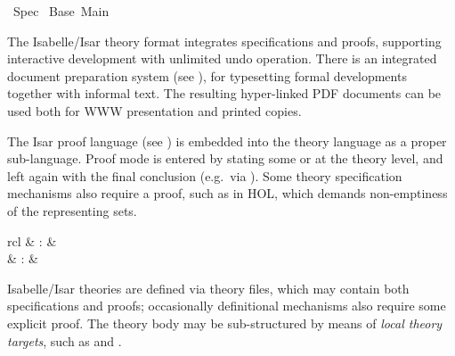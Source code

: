 %
\begin{isabellebody}%
\def\isabellecontext{Spec}%
%
\isadelimtheory
%
\endisadelimtheory
%
\isatagtheory
{}\isamarkupfalse%
\ Spec\isanewline
{}\ Base\ Main\isanewline
{}%
\endisatagtheory
{\isafoldtheory}%
%
\isadelimtheory
%
\endisadelimtheory
%
\isamarkuptrue%
%
\begin{isamarkuptext}%
The Isabelle/Isar theory format integrates specifications and
  proofs, supporting interactive development with unlimited undo
  operation.  There is an integrated document preparation system (see
  ), for typesetting formal developments
  together with informal text.  The resulting hyper-linked PDF
  documents can be used both for WWW presentation and printed copies.

  The Isar proof language (see ) is embedded into the
  theory language as a proper sub-language.  Proof mode is entered by
  stating some \hyperlink{command.theorem}{\mbox{}} or \hyperlink{command.lemma}{\mbox{}} at the theory
  level, and left again with the final conclusion (e.g.\ via \hyperlink{command.qed}{\mbox{}}).  Some theory specification mechanisms also require a proof,
  such as \hyperlink{command.typedef}{\mbox{}} in HOL, which demands non-emptiness of
  the representing sets.%
\end{isamarkuptext}%
\isamarkuptrue%
%
\isamarkuptrue%
%
\begin{isamarkuptext}%
\begin{matharray}{rcl}
    \hypertarget{command.theory}{\hyperlink{command.theory}{\mbox{}}} & : &  \\
    \hypertarget{command.global.end}{\hyperlink{command.global.end}{\mbox{}}} & : &  \\
  \end{matharray}

  Isabelle/Isar theories are defined via theory files, which may
  contain both specifications and proofs; occasionally definitional
  mechanisms also require some explicit proof.  The theory body may be
  sub-structured by means of \emph{local theory targets}, such as
  \hyperlink{command.locale}{\mbox{}} and \hyperlink{command.class}{\mbox{}}.


\end{isamarkuptext}
\end{isabellebody}
